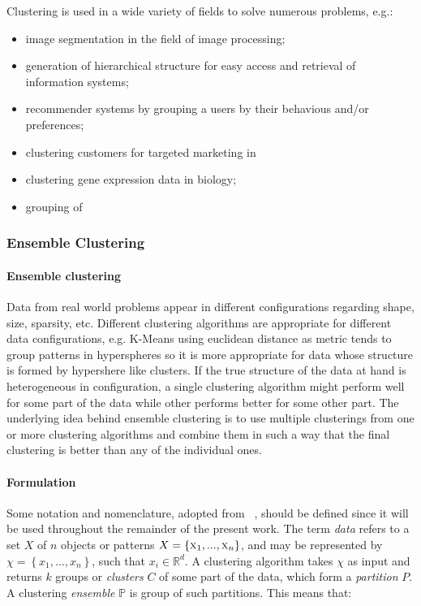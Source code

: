 Clustering is used in a wide variety of fields to solve numerous problems, e.g.:
\begin{itemize}
\item image segmentation in the field of image processing;
\item generation of hierarchical structure for easy access and retrieval of information systems;
\item recommender systems by grouping a users by their behavious and/or preferences;
\item clustering customers for targeted marketing in 
\item clustering gene expression data in biology;
\item grouping of 
\end{itemize}



\subsubsection{Ensemble Clustering}
\label{sec:eac}

\paragraph{Ensemble clustering}
Data from real world problems appear in different configurations regarding shape, size, sparsity, etc. %
Different clustering algorithms are appropriate for different data configurations, e.g. K-Means using euclidean distance as metric tends to group patterns in hyperspheres so it is more appropriate for data whose structure is formed by hypershere like clusters.%
If the true structure of the data at hand is heterogeneous in configuration, a single clustering algorithm might perform well for some part of the data while other performs better for some other part. The underlying idea behind ensemble clustering is to use multiple clusterings from one or more clustering algorithms and combine them in such a way that the final clustering is better than any of the individual ones.

\paragraph{Formulation}
Some notation and nomenclature, adopted from ~\cite{Fred2005}, should be defined since it will be used throughout the remainder of the present work. The term \emph{data} refers to a set $X$ of $n$ objects or patterns $X=\left \{ \textsc{x}_1,...,\textsc{x}_n \right \}$, and may be represented by $\chi = \left \{ x_1,...,x_n \right \}$, such that $x_i \in  \mathbb{R}^d$. A clustering algorithm takes $\chi$ as input and returns $k$ groups or \emph{clusters} $C$ of some part of the data, which form a \emph{partition} $P$. A clustering \emph{ensemble} $\mathbb{P}$ is group of such partitions. This means that:

